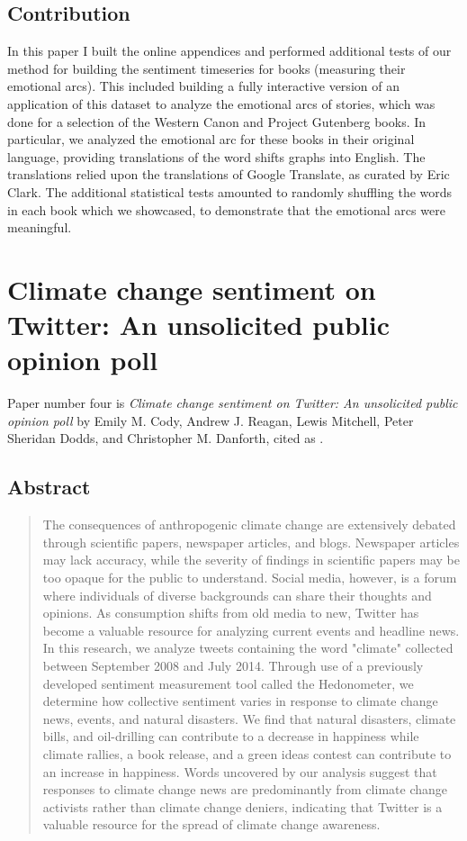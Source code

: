 \subsection{Contribution}

In this paper I built the online appendices and performed additional tests of our method for building the sentiment timeseries for books (measuring their emotional arcs).
This included building a fully interactive version of an application of this dataset to analyze the emotional arcs of stories, which was done for a selection of the Western Canon and Project Gutenberg books.
In particular, we analyzed the emotional arc for these books in their original language, providing translations of the word shifts graphs into English.
The translations relied upon the translations of Google Translate, as curated by Eric Clark.
The additional statistical tests amounted to randomly shuffling the words in each book which we showcased, to demonstrate that the emotional arcs were meaningful.

\section{Climate change sentiment on Twitter: An unsolicited public opinion poll}

Paper number four is \textit{Climate change sentiment on Twitter: An unsolicited public opinion poll} by Emily M. Cody, Andrew J. Reagan, Lewis Mitchell, Peter Sheridan Dodds, and Christopher M. Danforth, cited as \cite{cody2015climate}.

\subsection{Abstract}
\begin{quote}
  The consequences of anthropogenic climate change are extensively debated through scientific papers, newspaper articles, and blogs.
Newspaper articles may lack accuracy, while the severity of findings in scientific papers may be too opaque for the public to understand.
Social media, however, is a forum where individuals of diverse backgrounds can share their thoughts and opinions.
As consumption shifts from old media to new, Twitter has become a valuable resource for analyzing current events and headline news.
In this research, we analyze tweets containing the word "climate" collected between September 2008 and July 2014.
Through use of a previously developed sentiment measurement tool called the Hedonometer, we determine how collective sentiment varies in response to climate change news, events, and natural disasters.
We find that natural disasters, climate bills, and oil-drilling can contribute to a decrease in happiness while climate rallies, a book release, and a green ideas contest can contribute to an increase in happiness.
Words uncovered by our analysis suggest that responses to climate change news are predominantly from climate change activists rather than climate change deniers, indicating that Twitter is a valuable resource for the spread of climate change awareness.
\end{quote}

